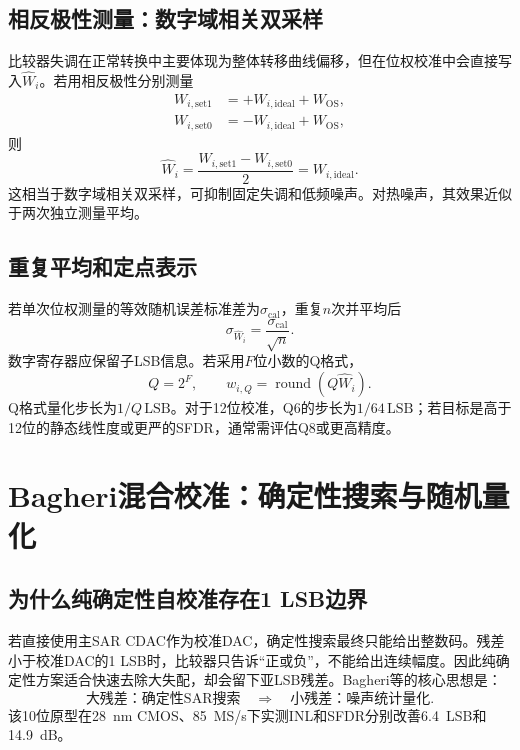\documentclass[UTF8,a4paper,11pt]{ctexart}
\newcommand{\LSB}{\mathrm{LSB}}
\newcommand{\round}{\operatorname{round}}
\begin{document}
\subsection{相反极性测量：数字域相关双采样}

比较器失调在正常转换中主要体现为整体转移曲线偏移，但在位权校准中会直接写入$\widehat W_i$。若用相反极性分别测量
\begin{align}
W_{i,\mathrm{set1}}&=+W_{i,\mathrm{ideal}}+W_{\mathrm{OS}},\\
W_{i,\mathrm{set0}}&=-W_{i,\mathrm{ideal}}+W_{\mathrm{OS}},
\end{align}
则
\begin{equation}
\widehat W_i=\frac{W_{i,\mathrm{set1}}-W_{i,\mathrm{set0}}}{2}=W_{i,\mathrm{ideal}}.
\label{eq:opposite_code}
\end{equation}
这相当于数字域相关双采样，可抑制固定失调和低频噪声。对热噪声，其效果近似于两次独立测量平均。\cite{chen2024}

\subsection{重复平均和定点表示}

若单次位权测量的等效随机误差标准差为$\sigma_{\mathrm{cal}}$，重复$n$次并平均后
\begin{equation}
\sigma_{\widehat W_i}=\frac{\sigma_{\mathrm{cal}}}{\sqrt n}.
\label{eq:average_noise}
\end{equation}
数字寄存器应保留子LSB信息。若采用$F$位小数的Q格式，
\begin{equation}
Q=2^F,\qquad w_{i,Q}=\round(Q\widehat W_i).
\end{equation}
Q格式量化步长为$1/Q\,\LSB$。对于12位校准，Q6的步长为$1/64\,\LSB$；若目标是高于12位的静态线性度或更严的SFDR，通常需评估Q8或更高精度。

\section{Bagheri混合校准：确定性搜索与随机量化}

\subsection{为什么纯确定性自校准存在1 LSB边界}

若直接使用主SAR CDAC作为校准DAC，确定性搜索最终只能给出整数码。残差小于校准DAC的1 LSB时，比较器只告诉“正或负”，不能给出连续幅度。因此纯确定性方案适合快速去除大失配，却会留下亚LSB残差。Bagheri等的核心思想是：
\begin{equation}
\text{大残差：确定性SAR搜索}\quad\Longrightarrow\quad
\text{小残差：噪声统计量化}.
\end{equation}
该10位原型在\SI{28}{nm} CMOS、\SI{85}{MS/s}下实测INL和SFDR分别改善\SI{6.4}{LSB}和\SI{14.9}{dB}。\cite{bagheri2020}
\end{document}
